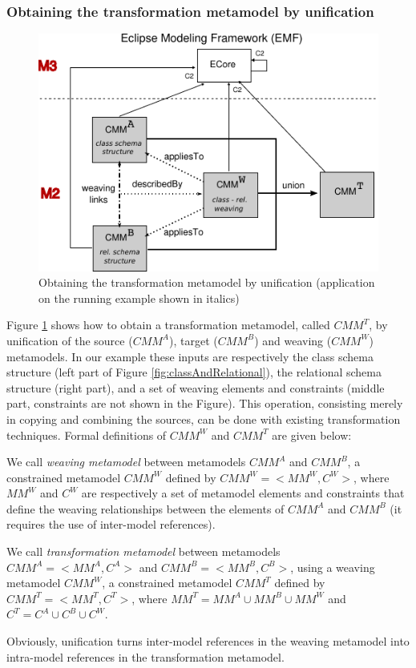 \documentclass{llncs}
\begin{document}
\subsubsection{Obtaining the transformation metamodel by unification}
\begin{figure}[htb]
 \begin{center}
     \includegraphics[scale=1.0]{img/CMMT-creation-with_example-lighter.pdf}
\caption{Obtaining the transformation metamodel by unification (application on the running example shown in italics)}
   \label{fig:CMMT-unification}
 \end{center}
\end{figure}
%
Figure \ref{fig:CMMT-unification} shows how to obtain a
transformation metamodel, called $CMM^T$, by unification of the source ($CMM^A$), target ($CMM^B$) and weaving ($CMM^W$) metamodels. In our example these inputs are respectively the class schema structure (left part of Figure \ref{fig:classAndRelational}), the relational schema structure (right part), and a set of weaving elements and constraints (middle part, constraints are not shown in the Figure). This operation, consisting merely in copying and combining the sources, can be done with existing transformation techniques. Formal definitions of $CMM^W$ and $CMM^T$ are given below:
%
\begin{definition}\label{def:weaving-metamodel} We call \emph{weaving metamodel} between metamodels $CMM^A$ and $CMM^B$, a constrained metamodel $CMM^W$ defined by $CMM^W = <MM^W,C^W>$, where $MM^W$ and $C^W$ are respectively a set of metamodel elements and constraints that define the weaving relationships between the elements of $CMM^A$ and $CMM^B$ (it requires the use of inter-model references).
\end{definition}
%
\begin{definition}\label{def:transformation-metamodel} We call \emph{transformation metamodel} between metamodels $CMM^A = <MM^A, C^A>$ and $CMM^B = <MM^B, C^B>$, using a weaving metamodel $CMM^W$, a constrained metamodel $CMM^T$ defined by $CMM^T = <MM^T,C^T>$, where $MM^T = MM^A \cup MM^B \cup MM^W$ and $C^T = C^A \cup C^B \cup C^W$.\\
\end{definition}
%
Obviously, unification turns inter-model references in the weaving metamodel into intra-model references in the transformation metamodel.
%
\end{document}
